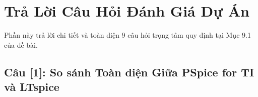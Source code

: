 \documentclass[12pt,a4paper]{report}
\begin{document}
\chapter{Trả Lời Câu Hỏi Đánh Giá Dự Án}

Phần này trả lời chi tiết và toàn diện 9 câu hỏi trọng tâm quy định tại Mục 9.1 của đề bài.

\section*{Câu [1]: So sánh Toàn diện Giữa PSpice for TI và LTspice}
\end{document}
